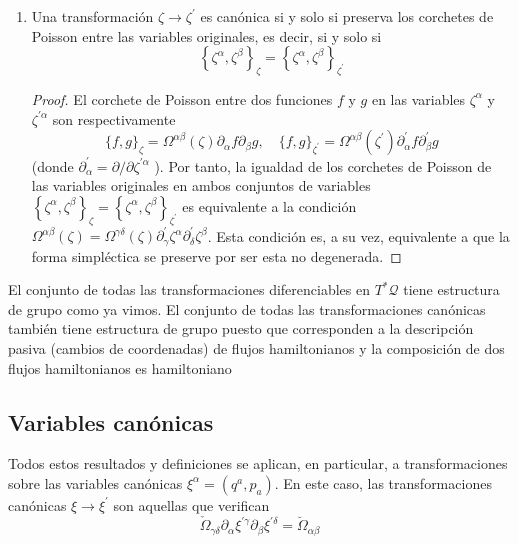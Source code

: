 \begin{enumerate}
\begin{proof}
El primer término se anula por ser $\Omega$ cerrada. Por tanto, $X$ genera una transformación canónica si y solo si $0=\mathfrak{L}_{X} \Omega=\mathrm{d} i_{X} \Omega$. Esta condición es necesaria y suficiente para que exista (localmente) una función $f$ tal que $i_{X} \Omega=-\mathrm{d} f$.
  \end{proof}
  \item Una transformación $\zeta \rightarrow \zeta^{\prime}$ es canónica si y solo si preserva los corchetes de Poisson entre las variables originales, es decir, si y solo si
  $$
  \left\{\zeta^{\alpha}, \zeta^{\beta}\right\}_{\zeta}=\left\{\zeta^{\alpha}, \zeta^{\beta}\right\}_{\zeta^{\prime}}
  $$
  \begin{proof}
    El corchete de Poisson entre dos funciones $f$ y $g$ en las variables $\zeta^{\alpha}$ y $\zeta^{\prime \alpha}$ son respectivamente
    $$
    \{f, g\}_{\zeta}=\Omega^{\alpha \beta}(\zeta) \partial_{\alpha} f \partial_{\beta} g, \quad\{f, g\}_{\zeta^{\prime}}=\Omega^{\alpha \beta}\left(\zeta^{\prime}\right) \partial_{\alpha}^{\prime} f \partial_{\beta}^{\prime} g
    $$
    (donde $\partial_{\alpha}^{\prime}=\partial / \partial \zeta^{\prime \alpha}$ ). Por tanto, la igualdad de los corchetes de Poisson de las variables originales en ambos conjuntos de variables $\left\{\zeta^{\alpha}, \zeta^{\beta}\right\}_{\zeta}=\left\{\zeta^{\alpha}, \zeta^{\beta}\right\}_{\zeta^{\prime}}$ es equivalente a la condición $\Omega^{\alpha \beta}(\zeta)=\Omega^{\gamma \delta}(\zeta) \partial_{\gamma}^{\prime} \zeta^{\alpha} \partial_{\delta}^{\prime} \zeta^{\beta}$. Esta condición es, a su vez, equivalente a que la forma simpléctica se preserve por ser esta no degenerada.
  \end{proof}
\end{enumerate}
El conjunto de todas las transformaciones diferenciables en $T^{*} \mathscr{Q}$ tiene estructura de grupo como ya vimos. El conjunto de todas las transformaciones canónicas también tiene estructura de grupo puesto que corresponden a la descripción pasiva (cambios de coordenadas) de flujos hamiltonianos y la composición de dos flujos hamiltonianos es hamiltoniano
\subsection{Variables canónicas}
Todos estos resultados y definiciones se aplican, en particular, a transformaciones sobre las variables canónicas $\xi^{\alpha}=\left(q^{a}, p_{a}\right)$. En este caso, las transformaciones canónicas $\xi \rightarrow \xi^{\prime}$ son aquellas que verifican
$$
\check{\Omega}_{\gamma \delta} \partial_{\alpha} \xi^{\prime \gamma} \partial_{\beta} \xi^{\prime \delta}=\breve{\Omega}_{\alpha \beta}
$$

